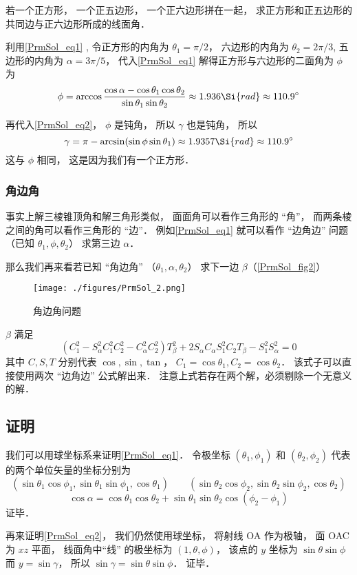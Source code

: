 \begin{example}{}
若一个正方形， 一个正五边形， 一个正六边形拼在一起， 求正方形和正五边形的共同边与正六边形所成的线面角．

利用\autoref{PrmSol_eq1} , 令正方形的内角为 $\theta_1 = \pi/2$， 六边形的内角为 $\theta_2 = 2\pi/3$, 五边形的内角为 $\alpha = 3\pi/5$， 代入\autoref{PrmSol_eq1} 解得正方形与六边形的二面角为 $\phi$ 为
\begin{equation}
\phi = \arccos\frac{\cos\alpha - \cos\theta_1 \cos\theta_2}{\sin\theta_1\sin\theta_2} \approx 1.936\Si{rad} \approx 110.9^\circ
\end{equation}

再代入\autoref{PrmSol_eq2}， $\phi$ 是钝角， 所以 $\gamma$ 也是钝角， 所以
\begin{equation}
\gamma = \pi - \arcsin(\sin\phi \sin\theta_1) \approx 1.9357 \Si{rad} \approx 110.9^\circ
\end{equation}
这与 $\phi$ 相同， 这是因为我们有一个正方形．
\end{example}

\subsubsection{角边角}
事实上解三棱锥顶角和解三角形类似， 面面角可以看作三角形的 “角”， 而两条棱之间的角可以看作三角形的 “边”． 例如\autoref{PrmSol_eq1} 就可以看作 “边角边” 问题 （已知 $\theta_1, \phi, \theta_2$） 求第三边 $\alpha$．


那么我们再来看若已知 “角边角” （$\theta_1, \alpha, \theta_2$） 求下一边 $\beta$（\autoref{PrmSol_fig2}）
\begin{figure}[ht]
\centering
\texttt{[image: ./figures/PrmSol\_2.png]}
\caption{角边角问题} \label{PrmSol_fig2}
\end{figure}
$\beta$ 满足
\begin{equation}\label{PrmSol_eq3}
(C_1^2 - S_\alpha^2 C_1^2 C_2^2 - C_\alpha^2 C_2^2)T_\beta^2 + 2S_\alpha C_\alpha S_1^2 C_2 T_\beta - S_1^2 S_\alpha^2 = 0
\end{equation}
其中 $C,S,T$ 分别代表 $\cos, \sin, \tan$， $C_1 = \cos\theta_1, C_2 = \cos\theta_2$． 该式子可以直接使用两次 “边角边” 公式解出来． 注意上式若存在两个解，必须剔除一个无意义的解．

\subsection{证明}
我们可以用球坐标系来证明\autoref{PrmSol_eq1}． 令极坐标 $(\theta_1, \phi_1)$ 和 $(\theta_2, \phi_2)$ 代表的两个单位矢量的坐标分别为
\begin{equation}
(\sin\theta_1\cos\phi_1, \sin\theta_1\sin\phi_1, \cos\theta_1)
\qquad
(\sin\theta_2\cos\phi_2, \sin\theta_2\sin\phi_2, \cos\theta_2)
\end{equation}
\begin{equation}
\cos\alpha = \cos\theta_1 \cos\theta_2 + \sin\theta_1 \sin\theta_2 \cos(\phi_2 - \phi_1)
\end{equation}
证毕．

再来证明\autoref{PrmSol_eq2}， 我们仍然使用球坐标， 将射线 OA 作为极轴， 面 OAC 为 $xz$ 平面， 线面角中“线” 的极坐标为 $(1, \theta, \phi)$， 该点的 $y$ 坐标为 $\sin\theta \sin\phi$ 而 $y = \sin\gamma$， 所以 $\sin\gamma = \sin\theta \sin\phi$． 证毕．